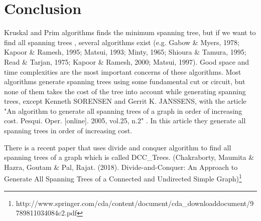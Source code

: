 \documentclass[11pt]{article}
\begin{document}
\section{Conclusion}
Kruskal and Prim algorithms finds the minimum spanning tree, but if we want to find all spanning trees , several algorithms exist (e.g. Gabow \& Myers, 1978; Kapoor \& Ramesh, 1995; Matsui, 1993; Minty, 1965; Shioura \& Tamura, 1995; Read \& Tarjan, 1975; Kapoor \& Ramesh, 2000; Matsui, 1997). Good space and time complexities are the most important concerns of these algorithms. Most algorithms generate spanning trees using some fundamental cut or circuit, but none of them takes the cost of the tree into account while generating spanning trees, except Kenneth SORENSEN  and  Gerrit K. JANSSENS,  with the article "An algorithm to generate all spanning trees of a graph in order of increasing cost. Pesqui. Oper. [online]. 2005, vol.25, n.2" . In this article they generate all spanning trees in order of increasing cost.

There is a recent paper that uses divide and conquer algorithm to find all spanning trees of a graph which is called DCC\_Trees. (Chakraborty, Maumita \& Hazra, Goutam \& Pal, Rajat. (2018). Divide-and-Conquer: An Approach to Generate All Spanning Trees of a Connected and Undirected Simple Graph)\footnote{http://www.springer.com/cda/content/document/cda\_downloaddocument/9789811034084\-c2.pdf}
\end{document}
